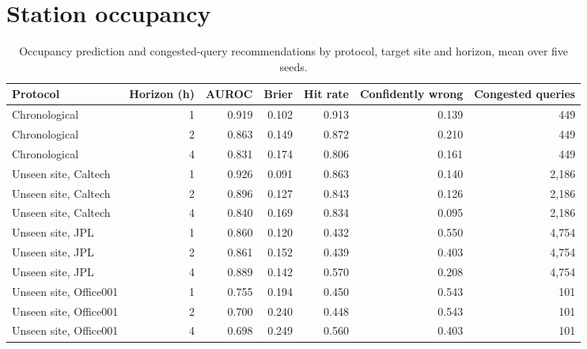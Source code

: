 \section{Station occupancy}
\begin{table}[H]\centering\footnotesize
\caption{Occupancy prediction and congested-query recommendations by protocol, target site and horizon, mean over five seeds.}\label{tab:s-occ}
\begin{tabular}{lrrrrrr}\toprule
Protocol & Horizon (h) & AUROC & Brier & Hit rate & Confidently wrong & Congested queries \\\midrule
Chronological & 1 & 0.919 & 0.102 & 0.913 & 0.139 & 449 \\
Chronological & 2 & 0.863 & 0.149 & 0.872 & 0.210 & 449 \\
Chronological & 4 & 0.831 & 0.174 & 0.806 & 0.161 & 449 \\
Unseen site, Caltech & 1 & 0.926 & 0.091 & 0.863 & 0.140 & 2,186 \\
Unseen site, Caltech & 2 & 0.896 & 0.127 & 0.843 & 0.126 & 2,186 \\
Unseen site, Caltech & 4 & 0.840 & 0.169 & 0.834 & 0.095 & 2,186 \\
Unseen site, JPL & 1 & 0.860 & 0.120 & 0.432 & 0.550 & 4,754 \\
Unseen site, JPL & 2 & 0.861 & 0.152 & 0.439 & 0.403 & 4,754 \\
Unseen site, JPL & 4 & 0.889 & 0.142 & 0.570 & 0.208 & 4,754 \\
Unseen site, Office001 & 1 & 0.755 & 0.194 & 0.450 & 0.543 & 101 \\
Unseen site, Office001 & 2 & 0.700 & 0.240 & 0.448 & 0.543 & 101 \\
Unseen site, Office001 & 4 & 0.698 & 0.249 & 0.560 & 0.403 & 101 \\
\bottomrule\end{tabular}\end{table}

